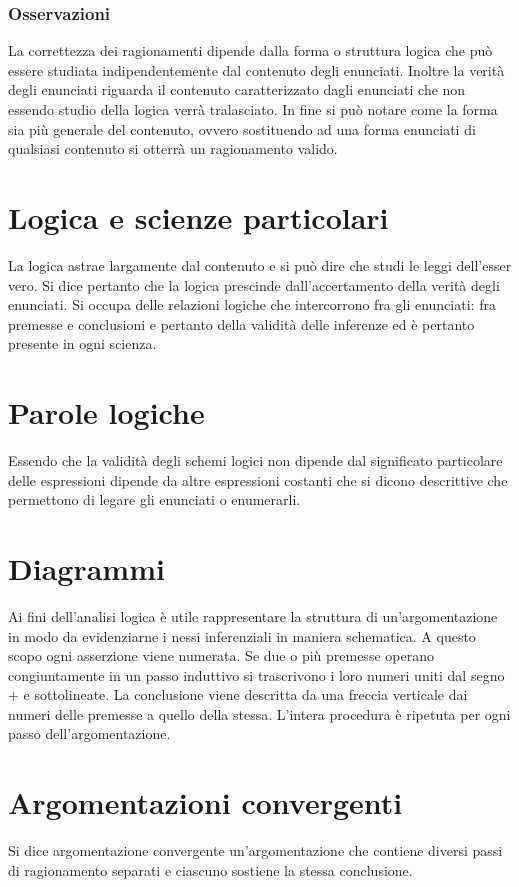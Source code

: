 \subsubsection{Osservazioni}
La correttezza dei ragionamenti dipende dalla forma o struttura logica che pu\`o essere studiata indipendentemente dal contenuto degli enunciati. Inoltre la verit\`a degli enunciati riguarda il contenuto 
caratterizzato dagli enunciati che non essendo studio della logica verr\`a tralasciato. In fine si pu\`o notare come la forma sia pi\`u generale del contenuto, ovvero sostituendo ad una forma enunciati di qualsiasi 
contenuto si otterr\`a un ragionamento valido.
\section{Logica e scienze particolari}
La logica astrae largamente dal contenuto e si pu\`o dire che studi le leggi dell'esser vero. Si dice pertanto che la logica prescinde dall'accertamento della verit\`a degli enunciati. Si occupa delle relazioni logiche 
che intercorrono fra gli enunciati: fra premesse e conclusioni e pertanto della validit\`a delle inferenze ed \`e pertanto presente in ogni scienza. 
\section{Parole logiche}
Essendo che la validit\`a degli schemi logici non dipende dal significato particolare delle espressioni dipende da altre espressioni costanti che si dicono descrittive che permettono di legare gli enunciati o 
enumerarli.
\section{Diagrammi}
Ai fini dell'analisi logica \`e utile rappresentare la struttura di un'argomentazione in modo da evidenziarne i nessi inferenziali in maniera schematica. A questo scopo ogni asserzione viene numerata. Se due o 
pi\`u premesse operano congiuntamente in un passo induttivo si trascrivono i loro numeri uniti dal segno $+$ e sottolineate. La conclusione viene descritta da una freccia verticale dai numeri delle premesse a 
quello della stessa. L'intera procedura \`e ripetuta per ogni passo dell'argomentazione. 
\section{Argomentazioni convergenti}
Si dice argomentazione convergente un'argomentazione che contiene diversi passi di ragionamento separati e ciascuno sostiene la stessa conclusione. 
